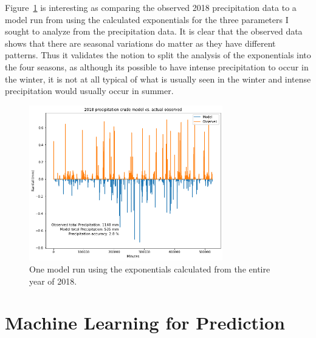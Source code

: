 \documentclass[11pt]{report}
\begin{document}
Figure~\ref{crudesmodel_whole2018} is interesting as comparing
the observed 2018 precipitation data to a model run from using the
calculated exponentials for the three parameters I sought to analyze from
the precipitation data. It is clear that the observed data shows that there
are seasonal variations do matter as they have different patterns.  Thus it
validates the notion to split the analysis of the exponentials into the four
seasons, as although its possible to have intense precipitation to occur in
the winter, it is not at all typical of what is usually seen in the winter
and intense precipitation would usually occur in summer.\\[1em]

\begin{figure}[h!]
  \centering
  \includegraphics[width=0.75\textwidth]{Figures/whole2018_model.png}
  \caption[Running model for entire 2018 ]
  {\label{crudesmodel_whole2018}One model run using the exponentials calculated from
    the entire year of 2018. }
\end{figure}

\clearpage

\section{Machine Learning for Prediction}\label{sec:MLP}




\end{document}
